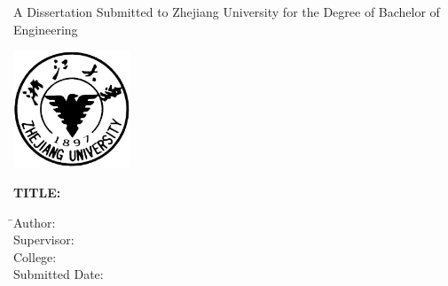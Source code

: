 
\newpage
\thispagestyle{empty}

\vspace{5mm}

\begin{center}
    \songti\xiaoyi A Dissertation Submitted to Zhejiang University for the Degree of Bachelor of Engineering
\end{center}

\vspace{4mm}

\begin{center}
  \includegraphics[width=35mm]{images/standxb}
\end{center}

\vspace{25mm}

{\hspace{-12mm}\songti\sanhao\bfseries TITLE:\hspace{4mm}\begin{minipage}[t]{128mm}\end{minipage}}

\vspace{7mm}

\begin{tabbing}
    \hspace{15mm} \= \sanhao Author:\hspace{19mm} \= \underline{\makebox[8cm]{\sanhao\zjuauthornamee\hspace{3mm}\zjuauthorid}} \\[2mm]
                  \> \sanhao Supervisor: \> \underline{\makebox[8cm]{\sanhao\zjumentore}} \\[2mm]
                  \> \sanhao College: \> \underline{\makebox[8cm]{\sanhao\zjucollegee}} \\[2mm]
                  \> \sanhao Submitted Date: \> \underline{\makebox[8cm]{\sanhao\zjusubmitteddatee}}
\end{tabbing}

